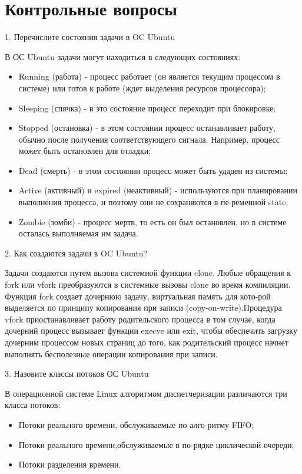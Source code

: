 \section*{Контрольные вопросы}
1. Перечислите состояния задачи в OC Ubuntu

В ОС Ubuntu задачи могут находиться в следующих состояниях:
\begin{itemize}
    \item Running (работа) - процесс работает (он является текущим процессом в системе) или готов к работе (ждет выделения ресурсов процессора);
    \item Sleeping (спячка) - в это состояние процесс переходит при блокировке;
    \item Stopped (остановка) - в этом состоянии процесс останавливает работу, обычно после получения соответствующего сигнала. Например, процесс может быть остановлен для отладки;
    \item Dead (смерть) - в этом состоянии процесс может быть удаден из системы;
    \item Active (активный) и expired (неактивный) - используются при планировании выполнения процесса, и поэтому они не сохраняются в пе-ременной state;
    \item Zombie (зомби) - процесс мертв, то есть он был остановлен, но в системе осталась выполняемая им задача.
\end{itemize}

2. Как создаются задачи в OC Ubuntu?

Задачи создаются путем вызова системной функции clone. Любые обращения к fork или vfork преобразуются в системные вызовы clone во время компиляции. Функция fork создает дочернюю задачу, виртуальная память для кото-рой выделяется по принципу копирования при записи (copy-on-write).Процедура vfork приостанавливает  работу  родительского  процесса  в том случае, когда дочерний процесс вызывает функции execve или exit, чтобы обеспечить загрузку дочерним процессом новых страниц до того, как родительский процесс начнет выполнять бесполезные операции копирования при записи.

3. Назовите классы потоков ОС Ubuntu

В операционной системе Linux алгоритмом диспетчеризации различаются три класса потоков:

\begin{itemize}
    \item Потоки реального времени, обслуживаемые по алго-ритму FIFO;
    \item Потоки  реального  времени,обслуживаемые  в  по-рядке циклической очереди;
    \item Потоки разделения времени.
\end{itemize}

